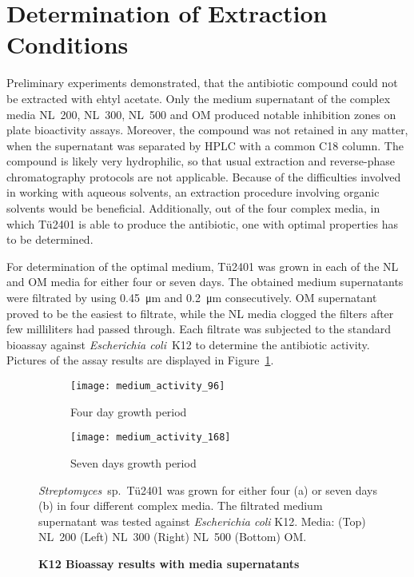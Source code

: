 
\section{Determination of Extraction Conditions} %
\label{sec:determination_of_extraction_conditions}

Preliminary experiments demonstrated, that the antibiotic compound could not be extracted with ehtyl acetate. Only the medium supernatant of the complex media NL~200, NL~300, NL~500 and OM produced notable inhibition zones on plate bioactivity assays. Moreover, the compound was not retained in any matter, when the supernatant was separated by HPLC with a common C18 column. The compound is likely very hydrophilic, so that usual extraction and reverse-phase chromatography protocols are not applicable. Because of the difficulties involved in working with aqueous solvents, an extraction procedure involving organic solvents would be beneficial. Additionally, out of the four complex media, in which Tü2401 is able to produce the antibiotic, one with optimal properties has to be determined.

For determination of the optimal medium, Tü2401 was grown in each of the NL and OM media for either four or seven days. The obtained medium supernatants were filtrated by using \SI{0.45}{\micro\meter} and \SI{0.2}{\micro\meter} consecutively. OM supernatant proved to be the easiest to filtrate, while the NL media clogged the filters after few milliliters had passed through. Each filtrate was subjected to the standard bioassay against \textit{Escherichia coli}~K12 to determine the antibiotic activity. Pictures of the assay results are displayed in Figure~\ref{fig:medium_activity}.

\begin{figure}[htbp]
	\centering
	\begin{subfigure}{0.5\textwidth}
		\texttt{[image: medium\_activity\_96]}
		\caption{Four day growth period}
	\end{subfigure}%
	\begin{subfigure}{0.5\textwidth}
		\texttt{[image: medium\_activity\_168]}
		\caption{Seven days growth period}
	\end{subfigure}
	\caption[K12 Bioassay results with media supernatants]{\textbf{K12 Bioassay results with media supernatants}} \textit{Streptomyces}~sp.~Tü2401 was grown for either four (a) or seven days (b) in four different complex media. The filtrated medium supernatant was tested against \textit{Escherichia coli} K12. Media: (Top) NL~200 (Left) NL~300 (Right) NL~500 (Bottom) OM.
	\label{fig:medium_activity}
\end{figure}

